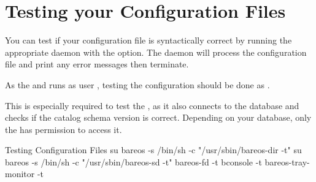 \section{Testing your Configuration Files}

You can test if your configuration file is syntactically correct by running
the appropriate daemon with the  option. The daemon will process the
configuration file and print any error messages then terminate.

As the \bareosDir and \bareosSd runs as user ,
testing the configuration should be done as .

This is especially required to test the \bareosDir,
as it also connects to the database and checks if the catalog schema version is correct.
Depending on your database, only the  has permission to access it.

\begin{commands}{Testing Configuration Files}
su bareos -s /bin/sh -c "/usr/sbin/bareos-dir -t"
su bareos -s /bin/sh -c "/usr/sbin/bareos-sd -t"
bareos-fd -t
bconsole -t
bareos-tray-monitor -t
\end{commands}

% 


%
% 

